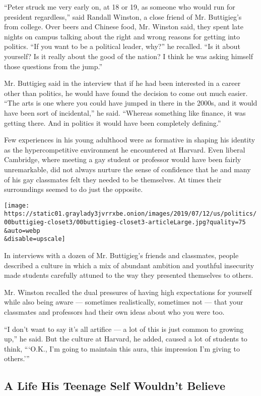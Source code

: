 ``Peter struck me very early on, at 18 or 19, as someone who would run
for president regardless,'' said Randall Winston, a close friend of Mr.
Buttigieg's from college. Over beers and Chinese food, Mr. Winston said,
they spent late nights on campus talking about the right and wrong
reasons for getting into politics. ``If you want to be a political
leader, why?'' he recalled. ``Is it about yourself? Is it really about
the good of the nation? I think he was asking himself those questions
from the jump.''

Mr. Buttigieg said in the interview that if he had been interested in a
career other than politics, he would have found the decision to come out
much easier. ``The arts is one where you could have jumped in there in
the 2000s, and it would have been sort of incidental,'' he said.
``Whereas something like finance, it was getting there. And in politics
it would have been completely defining.''

Few experiences in his young adulthood were as formative in shaping his
identity as the hypercompetitive environment he encountered at Harvard.
Even liberal Cambridge, where meeting a gay student or professor would
have been fairly unremarkable, did not always nurture the sense of
confidence that he and many of his gay classmates felt they needed to be
themselves. At times their surroundings seemed to do just the opposite.

\texttt{[image: https://static01.graylady3jvrrxbe.onion/images/2019/07/12/us/politics/00buttigieg-closet3/00buttigieg-closet3-articleLarge.jpg?quality=75\\\&auto=webp\\\&disable=upscale]}

In interviews with a dozen of Mr. Buttigieg's friends and classmates,
people described a culture in which a mix of abundant ambition and
youthful insecurity made students carefully attuned to the way they
presented themselves to others.

Mr. Winston recalled the dual pressures of having high expectations for
yourself while also being aware --- sometimes realistically, sometimes
not --- that your classmates and professors had their own ideas about
who you were too.

``I don't want to say it's all artifice --- a lot of this is just common
to growing up,'' he said. But the culture at Harvard, he added, caused a
lot of students to think, ```O.K., I'm going to maintain this aura, this
impression I'm giving to others.'''

\hypertarget{a-life-his-teenage-self-wouldnt-believe}{%
\subsection{A Life His Teenage Self Wouldn't
Believe}\label{a-life-his-teenage-self-wouldnt-believe}}

